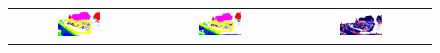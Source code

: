 \begin{figure}[h!]
\begin{tabular}{ccc}
            \includegraphics[width=0.33\textwidth, height=0.18\textheight]{images/seg_output/sem3d_seg_output/2_GT.png} &
            \includegraphics[width=0.33\textwidth, height=0.18\textheight]{images/seg_output/sem3d_seg_output/2_Pred.png}& 
            \includegraphics[width=0.33\textwidth, height=0.18\textheight]{images/seg_output/sem3d_seg_output/2_Entropy.png}\\


\end{tabular}
\end{figure}

